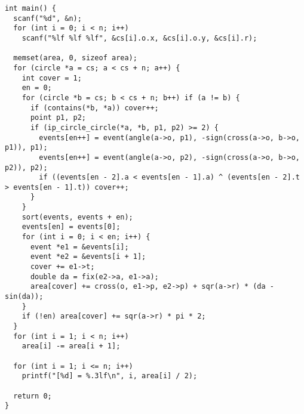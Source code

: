 \begin{verbatim}
int main() {
  scanf("%d", &n);
  for (int i = 0; i < n; i++)
    scanf("%lf %lf %lf", &cs[i].o.x, &cs[i].o.y, &cs[i].r);

  memset(area, 0, sizeof area);
  for (circle *a = cs; a < cs + n; a++) {
    int cover = 1;
    en = 0;
    for (circle *b = cs; b < cs + n; b++) if (a != b) {
      if (contains(*b, *a)) cover++;
      point p1, p2;
      if (ip_circle_circle(*a, *b, p1, p2) >= 2) {
        events[en++] = event(angle(a->o, p1), -sign(cross(a->o, b->o, p1)), p1);
        events[en++] = event(angle(a->o, p2), -sign(cross(a->o, b->o, p2)), p2);
        if ((events[en - 2].a < events[en - 1].a) ^ (events[en - 2].t > events[en - 1].t)) cover++;
      }
    }
    sort(events, events + en);
    events[en] = events[0];
    for (int i = 0; i < en; i++) {
      event *e1 = &events[i];
      event *e2 = &events[i + 1];
      cover += e1->t;
      double da = fix(e2->a, e1->a);
      area[cover] += cross(o, e1->p, e2->p) + sqr(a->r) * (da - sin(da));
    }
    if (!en) area[cover] += sqr(a->r) * pi * 2;
  }
  for (int i = 1; i < n; i++)
    area[i] -= area[i + 1];

  for (int i = 1; i <= n; i++)
    printf("[%d] = %.3lf\n", i, area[i] / 2);

  return 0;
}
\end{verbatim}
